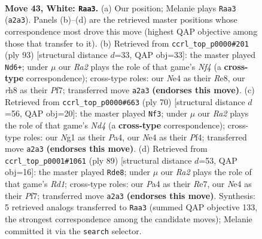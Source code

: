 \documentclass[11pt]{article}
\begin{document}
\clearpage

\begin{figure}[p]\centering
\begin{subfigure}{0.46\textwidth}\centering
\resizebox{\linewidth}{!}{%
\newchessgame
\chessboard[
  setfen={7r/3kn1br/4n1p1/7p/P3N2P/6R1/R5P1/5KN1 w - - 4 43},
  showmover=false,
  pgfstyle=straightmove, color=movearrow, markmove={a2-a3}
]}
\caption{}
\end{subfigure}\hfill
\begin{subfigure}{0.46\textwidth}\centering
\resizebox{\linewidth}{!}{%
\newchessgame
\chessboard[
  setfen={4r1k1/P4pp1/5r2/3pbn2/8/2P5/R3N3/R4KB1 b - - 0 47},
  showmover=false,
  pgfstyle=straightmove, color=movearrow, markmove={f5-d6}
]}
\caption{}
\end{subfigure}
\\[4pt]
\begin{subfigure}{0.46\textwidth}\centering
\resizebox{\linewidth}{!}{%
\newchessgame
\chessboard[
  setfen={5nk1/p2r2p1/7p/2pr4/P2NRP2/2P3R1/2K3P1/8 w - - 0 36},
  showmover=false,
  pgfstyle=straightmove, color=movearrow, markmove={d4-f3}
]}
\caption{}
\end{subfigure}\hfill
\begin{subfigure}{0.46\textwidth}\centering
\resizebox{\linewidth}{!}{%
\newchessgame
\chessboard[
  setfen={3r2k1/4rpp1/5n1p/R1R4P/2N5/6P1/5PK1/8 b - - 5 45},
  showmover=false,
  pgfstyle=straightmove, color=movearrow, markmove={d8-e8}
]}
\caption{}
\end{subfigure}
\caption{\textbf{Move 43, White: \texttt{Raa3}.} (a) Our position; Melanie plays \texttt{Raa3} (\texttt{a2a3}). Panels (b)--(d) are the retrieved master positions whose correspondence most drove this move (highest QAP objective among those that transfer to it). (b) Retrieved from \texttt{ccrl\_top\_p0000\#201} (ply 93) [structural distance $d$=33, QAP obj=33]: the master played \texttt{Nd6+}; under $\mu$ our \emph{Ra2} plays the role of that game's \emph{Nf4} (a \textbf{cross-type} correspondence); cross-type roles: our \emph{N}e4 as their \emph{R}e8, our \emph{r}h8 as their \emph{P}f7; transferred move \texttt{a2a3} \textbf{(endorses this move)}. (c) Retrieved from \texttt{ccrl\_top\_p0000\#663} (ply 70) [structural distance $d$=56, QAP obj=20]: the master played \texttt{Nf3}; under $\mu$ our \emph{Ra2} plays the role of that game's \emph{Nd4} (a \textbf{cross-type} correspondence); cross-type roles: our \emph{N}g1 as their \emph{P}a4, our \emph{N}e4 as their \emph{P}f4; transferred move \texttt{a2a3} \textbf{(endorses this move)}. (d) Retrieved from \texttt{ccrl\_top\_p0001\#1061} (ply 89) [structural distance $d$=53, QAP obj=16]: the master played \texttt{Rde8}; under $\mu$ our \emph{Ra2} plays the role of that game's \emph{Rd1}; cross-type roles: our \emph{P}a4 as their \emph{R}e7, our \emph{N}e4 as their \emph{P}f7; transferred move \texttt{a2a3} \textbf{(endorses this move)}. Synthesis: 5 retrieved analogs transferred to \texttt{Raa3} (summed QAP objective 133, the strongest correspondence among the candidate moves); Melanie committed it via the \texttt{search} selector.}
\label{fig:thought-m84}
\end{figure}
\end{document}
